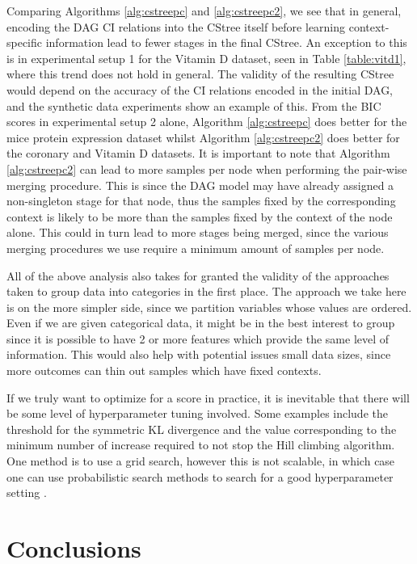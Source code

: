 \documentclass{tufte-book}
\begin{document}
Comparing Algorithms \ref{alg:cstreepc} and \ref{alg:cstreepc2}, we see that in general, encoding the DAG CI relations into the CStree itself before learning context-specific information lead to fewer stages in the final CStree. An exception to this is in experimental setup 1 for the Vitamin D dataset, seen in Table \ref{table:vitd1}, where this trend does not hold in general. The validity of the resulting CStree would depend on the accuracy of the CI relations encoded in the initial DAG, and the synthetic data experiments show an example of this. From the BIC scores in experimental setup 2 alone, Algorithm \ref{alg:cstreepc} does better for the mice protein expression dataset whilst Algorithm \ref{alg:cstreepc2} does better for the coronary and Vitamin D datasets.  It is important to note that Algorithm \ref{alg:cstreepc2} can lead to more samples per node when performing the pair-wise merging procedure. This is since the DAG model may have already assigned a non-singleton stage for that node, thus the samples fixed by the corresponding context is likely to be more than the samples fixed by the context of the node alone. This could in turn lead to more stages being merged, since the various merging procedures we use require a minimum amount of samples per node.


All of the above analysis also takes for granted the validity of the approaches taken to group data into categories in the first place. The approach we take here is on the more simpler side, since we partition variables whose values are ordered. Even if we are given categorical data, it might be in the best interest to group since it is possible to have 2 or more features which provide the same level of information. This would also help with potential issues small data sizes, since more outcomes can thin out samples which have fixed contexts.


If we truly want to optimize for a score in practice, it is inevitable that there will be some level of hyperparameter tuning involved. Some examples include the threshold for the symmetric KL divergence and the value corresponding to the minimum number of increase required to not stop the Hill climbing algorithm. One method is to use a grid search, however this is not scalable, in which case one can use probabilistic search methods to search for a good hyperparameter setting \cite{oh-2019-combin-bayes}.


\chapter{Conclusions}
\label{sec:org614e694}
\end{document}
